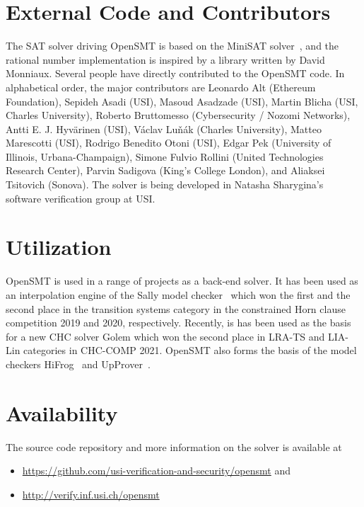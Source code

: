 \documentclass{easychair}
\begin{document}
\section{External Code and Contributors}

The SAT solver driving OpenSMT is based on the MiniSAT
solver~\cite{EenS:SAT03}, and the rational number implementation is
inspired by a library written by David Monniaux.  Several people have
directly contributed to the OpenSMT code.  In alphabetical order, the
major contributors are
%
Leonardo Alt (Ethereum Foundation),
Sepideh Asadi (USI),
Masoud Asadzade (USI),
Martin Blicha (USI, Charles University),
Roberto Bruttomesso (Cybersecurity / Nozomi Networks),
Antti E. J. Hyv{\"a}rinen (USI),
V{\'a}clav Lu{\v n}{\'a}k (Charles University),
Matteo Marescotti (USI),
Rodrigo Benedito Otoni (USI),
Edgar Pek (University of Illinois, Urbana-Champaign),
Simone Fulvio Rollini (United Technologies Research Center),
Parvin Sadigova (King's College London), and
Aliaksei Tsitovich (Sonova).
%
The solver is being developed in Natasha Sharygina's software
verification group at USI.

\section{Utilization}

OpenSMT is used in a range of projects as a back-end solver.  It has
been used as an interpolation engine of the Sally model
checker~\cite{JovanovicD:FMCAD16} which won the first and the second
place in the transition systems category in the constrained Horn clause
competition 2019 and 2020, respectively.  Recently, is has been used as
the basis for a new CHC solver Golem which won the second place in
LRA-TS and LIA-Lin categories in CHC-COMP 2021.  OpenSMT also forms the
basis of the model checkers HiFrog~\cite{AltACMFHS17} and
UpProver~\cite{Asadi_2020b}.

\section{Availability}
The source code repository and more information on the solver is
available at

\begin{itemize}
    \item \url{https://github.com/usi-verification-and-security/opensmt}
        and
    \item \url{http://verify.inf.usi.ch/opensmt}
\end{itemize}
\end{document}

